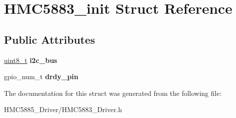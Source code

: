 \hypertarget{structHMC5883__init}{}\section{H\+M\+C5883\+\_\+init Struct Reference}
\label{structHMC5883__init}
\subsection*{Public Attributes}
\begin{DoxyCompactItemize}
\item 
\mbox{\label{structHMC5883__init_a8fcc55223034d87116e4a88416be05ab}} 
\hyperlink{vl53l0x__types_8h_aba7bc1797add20fe3efdf37ced1182c5}{uint8\+\_\+t} {\bfseries i2c\+\_\+bus}
\item 
\mbox{\label{structHMC5883__init_a8c9b48397e4df36740167f1c4e6e1e50}} 
gpio\+\_\+num\+\_\+t {\bfseries drdy\+\_\+pin}
\end{DoxyCompactItemize}


The documentation for this struct was generated from the following file\+:\begin{DoxyCompactItemize}
\item 
H\+M\+C5885\+\_\+\+Driver/H\+M\+C5883\+\_\+\+Driver.\+h\end{DoxyCompactItemize}
